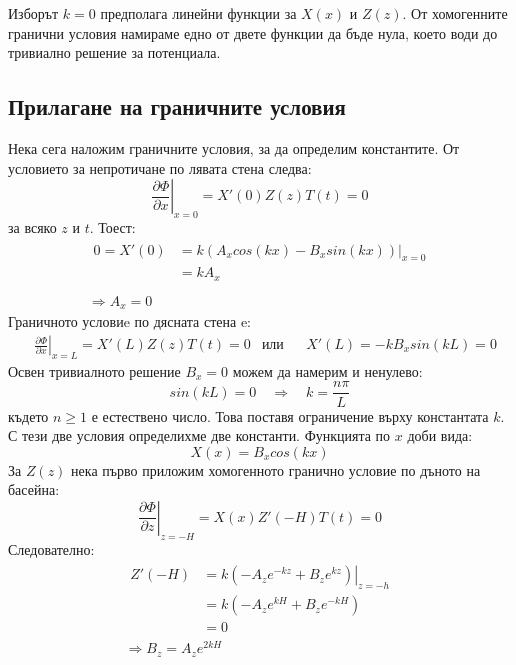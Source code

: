 \documentclass[12pt]{article}
\numberwithin{equation}{section}
\begin{document}
Изборът $k=0$ предполага линейни функции за $X(x)$ и $Z(z)$. От хомогенните гранични условия намираме едно от двете функции да бъде нула, което води до тривиално решение за потенциала.

\subsection{Прилагане на граничните условия}
Нека сега наложим граничните условия, за да определим константите. От условието за непротичане по лявата стена следва:
\begin{equation}
    \left. \frac{\partial\Phi}{\partial x} \right|_{x=0}
    = X'(0)Z(z)T(t)
    = 0
\end{equation}
за всяко $z$ и $t$. Тоест:
\begin{equation}
    \begin{split}
        \begin{aligned}
            0 = X'(0) &= \left. k(A_x cos(kx) - B_x sin(kx)) \right|_{x=0} \\
            &= k A_x \\
        \end{aligned} \\
        \Rightarrow
        A_x = 0
    \end{split}
\end{equation}
Граничното условиe по дясната стена e:
\begin{align}
    &\left. \frac{\partial\Phi}{\partial x} \right|_{x=L}
    = X'(L)Z(z)T(t)
    = 0
    &\text{или}&&
    X'(L) =-k B_x sin(kL) = 0
\end{align}
Освен тривиалното решение $B_x=0$ можем да намерим и ненулево:
\begin{equation}
    sin(kL)=0
    \quad\Rightarrow\quad
    k=\frac{n \pi}{L}
\end{equation}
където $n \geq 1$ е естествено число. Това поставя ограничение върху константата $k$. С тези две условия определихме две константи. Функцията по $x$ доби вида:
\begin{equation}
    X(x) = B_x cos(kx)
\end{equation}
За $Z(z)$ нека първо приложим хомогенното гранично условие по дъното на басейна:
\begin{equation}
    \left. \frac{\partial\Phi}{\partial z} \right|_{z=-H}
    = X(x)Z'(-H)T(t)
    = 0
\end{equation}
Следователно:
\begin{equation}
    \begin{split}
        \begin{aligned}
            Z'(-H) &= \left. k(-A_z e^{-kz} + B_z e^{kz}) \right|_{z=-h} \\
            & = k(-A_z e^{kH} + B_z e^{-kH}) \\
            & = 0
        \end{aligned} \\
        \Rightarrow
        B_z = A_z e^{2kH}
    \end{split}
\end{equation}
\end{document}

